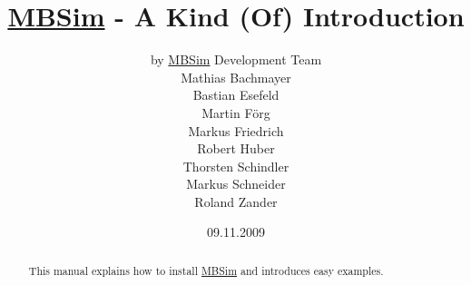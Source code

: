 \documentclass[fleqn,11pt]{article}
\newcommand{\MBSim}{\href{http://mbsim.berlios.de}{\textsf{MBSim}}}
\begin{document}
\title{\MBSim{} - A Kind (Of) Introduction}
\author{by \MBSim{} Development Team\\
  Mathias Bachmayer\\
  Bastian Esefeld\\
  Martin F\"org\\
  Markus Friedrich\\
  Robert Huber\\
  Thorsten Schindler\\
  Markus Schneider\\
  Roland Zander}
\date{09.11.2009}
\maketitle

\begin{abstract}
  This manual explains how to install \MBSim{} and introduces easy examples.
\end{abstract}

\noindent\hrulefill
\tableofcontents






\appendix





\end{document}

